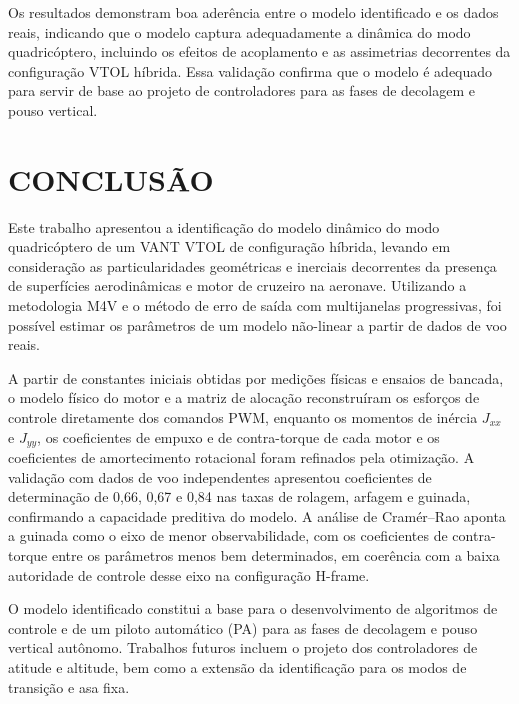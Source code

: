 \documentclass[letterpaper, 10 pt, conference]{ieeeconf}
\begin{document}
Os resultados demonstram boa aderência entre o modelo identificado e os dados reais, indicando que o modelo captura adequadamente a dinâmica do modo quadricóptero, incluindo os efeitos de acoplamento e as assimetrias decorrentes da configuração VTOL híbrida. Essa validação confirma que o modelo é adequado para servir de base ao projeto de controladores para as fases de decolagem e pouso vertical.

\section{CONCLUSÃO}

Este trabalho apresentou a identificação do modelo dinâmico do modo quadricóptero de um VANT VTOL de configuração híbrida, levando em consideração as particularidades geométricas e inerciais decorrentes da presença de superfícies aerodinâmicas e motor de cruzeiro na aeronave. Utilizando a metodologia M4V e o método de erro de saída com multijanelas progressivas, foi possível estimar os parâmetros de um modelo não-linear a partir de dados de voo reais.

A partir de constantes iniciais obtidas por medições físicas e ensaios de bancada, o modelo físico do motor e a matriz de alocação reconstruíram os esforços de controle diretamente dos comandos PWM, enquanto os momentos de inércia $J_{xx}$ e $J_{yy}$, os coeficientes de empuxo e de contra-torque de cada motor e os coeficientes de amortecimento rotacional foram refinados pela otimização. A validação com dados de voo independentes apresentou coeficientes de determinação de 0,66, 0,67 e 0,84 nas taxas de rolagem, arfagem e guinada, confirmando a capacidade preditiva do modelo. A análise de Cramér--Rao aponta a guinada como o eixo de menor observabilidade, com os coeficientes de contra-torque entre os parâmetros menos bem determinados, em coerência com a baixa autoridade de controle desse eixo na configuração H-frame.

O modelo identificado constitui a base para o desenvolvimento de algoritmos de controle e de um piloto automático (PA) para as fases de decolagem e pouso vertical autônomo. Trabalhos futuros incluem o projeto dos controladores de atitude e altitude, bem como a extensão da identificação para os modos de transição e asa fixa.

\addtolength{\textheight}{-12cm}   %
\end{document}
